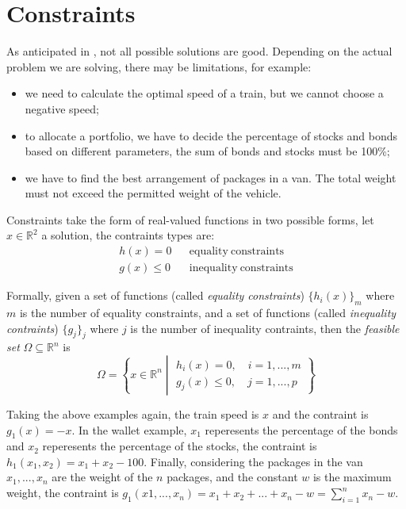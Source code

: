 
\section{Constraints}
\label{sec:op.contraints}

As anticipated in , not all possible solutions are good. Depending on the actual problem we are solving, there may be limitations, for example:
\begin{itemize}
    \item we need to calculate the optimal speed of a train, but we cannot choose a negative speed;
    \item to allocate a portfolio, we have to decide the percentage of stocks and bonds based on different parameters, the sum of bonds and stocks must be 100\%;
    \item we have to find the best arrangement of packages in a van. The total weight must not exceed the permitted weight of the vehicle.
\end{itemize}

Constraints take the form of real-valued functions in two possible forms, let \( x \in \mathbb{R}^2 \) a solution, the contraints types are:
\begin{align*}
    h(x) = 0 && \mathrm{equality~constraints} \\
    g(x) \leq 0  && \mathrm{inequality~constraints}
\end{align*}

Formally, given a set of functions (called \textit{equality constraints}) \( \{ h_i(x) \}_m \) where \( m \) is the number of equality constraints, and a set of functions (called \textit{inequality contraints}) \( \{ g_j \}_j \) where \( j \) is the number of inequality contraints, then the \textit{feasible set} \( \Omega \subseteq \mathbb{R}^n \) is
\[ 
    \Omega = \left\{ 
        x \in \mathbb{R}^n   
        \middle\vert
        \begin{array}{l}
            h_i(x) = 0, \quad i = 1, ..., m \\
            g_j(x) \leq 0, \quad j = 1, ..., p
        \end{array}
    \right\}
\]

Taking the above examples again, the train speed is \( x \) and the contraint is \( g_1(x) = -x \). In the wallet example, \( x_1 \) reperesents the percentage of the bonds and \( x_2 \) reperesents the percentage of the stocks, the contraint is \( h_1(x_1, x_2) = x_1 + x_2 - 100 \). Finally, considering the packages in the van \( x_1, ..., x_n \) are the weight of the \( n \) packages, and the constant \( w \) is the maximum weight, the contraint is \( g_1(x1, ..., x_n) = x_1 + x_2 + ... + x_n - w = \sum\limits_{i = 1}^{n} x_n - w \).

